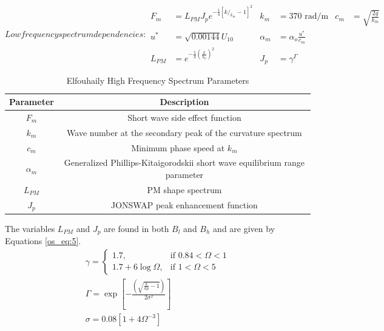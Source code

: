 \renewcommand{\baselinestretch}{2} \small\normalsize
\begin{subequations}
   Low frequency spectrum dependencies:
\begin{align*}
  F_m &= L_{PM}J_pe^{-\frac{1}{4}\left[k/_{k_m} - 1 \right]^2 } & k_m & = 370 \text{ rad/m} &  c_m &=\sqrt{\frac{2g}{k_m}} \\
  u^* &= \sqrt{0.00144}U_{10}  & \alpha_m &= \alpha_o\frac{u^*}{c_m}  \\
  L_{PM} &=e^{-\frac{5}{4}\left(\frac{k}{k_p} \right)^2}  &  J_p &= \gamma^\Gamma
\end{align*}
\end{subequations}
\renewcommand{\baselinestretch}{2} \small\normalsize
\begin{table}[H]
\begin{center}
  \begin{tabular} {|c | c |}
    \hline
  \bf{Parameter} & \bf{Description} \\ \hline
  $F_m$ & Short wave side effect function \\ \hline
  $k_m$ &  Wave number at the secondary peak of the curvature spectrum \\ \hline
  $c_m$ &  Minimum phase speed at $k_m$ \\ \hline
  $\alpha_m$ & Generalized Phillips-Kitaigorodskii short wave equilibrium range parameter \\ \hline
  $L_{PM}$ & PM shape spectrum \\ \hline
  $J_p$ & JONSWAP peak enhancement function \\ \hline
\end{tabular}
  \renewcommand{\baselinestretch}{1} \small\normalsize
  \begin{quote}
    \caption[Elfouhaily High Frequency Spectrum Parameters]{Elfouhaily High Frequency Spectrum Parameters\label{os_tab:2}}
  \end{quote}
\end{center}
\end{table}
\renewcommand{\baselinestretch}{2} \small\normalsize
The variables $L_{PM}$ and $J_p$ are found in both $B_l$ and $B_h$ and are given by Equations \ref{os_eq:5}.
\begin{equation}
\begin{gathered}
  \label{os_eq:5}
    \gamma = \begin{cases}
    1.7,& \text{if } 0.84 < \Omega < 1\\
    1.7 + 6\log{\Omega}, & \text{if } 1 < \Omega < 5
  \end{cases} \\
  \Gamma = \exp{\left[- \frac{\left(\sqrt{\frac{k}{kp} - 1} \right)}{2\sigma^2} \right]} \\
  \sigma = 0.08\left[1 + 4\Omega^{-3} \right] \\
\end{gathered}
\end{equation}
